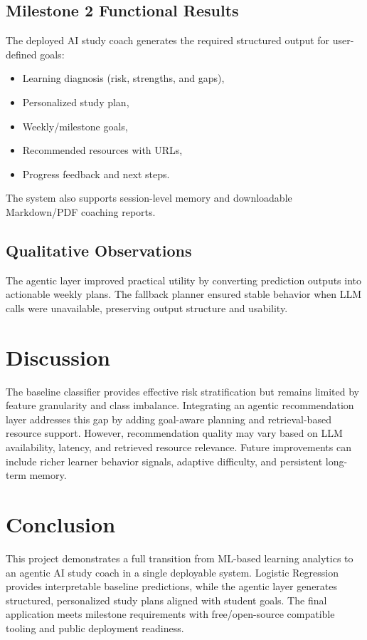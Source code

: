 \documentclass[conference]{IEEEtran}
\begin{document}
\subsection{Milestone 2 Functional Results}
The deployed AI study coach generates the required structured output for user-defined goals:
\begin{itemize}
    \item Learning diagnosis (risk, strengths, and gaps),
    \item Personalized study plan,
    \item Weekly/milestone goals,
    \item Recommended resources with URLs,
    \item Progress feedback and next steps.
\end{itemize}
The system also supports session-level memory and downloadable Markdown/PDF coaching reports.

\subsection{Qualitative Observations}
The agentic layer improved practical utility by converting prediction outputs into actionable weekly plans. The fallback planner ensured stable behavior when LLM calls were unavailable, preserving output structure and usability.

\section{Discussion}
The baseline classifier provides effective risk stratification but remains limited by feature granularity and class imbalance. Integrating an agentic recommendation layer addresses this gap by adding goal-aware planning and retrieval-based resource support. However, recommendation quality may vary based on LLM availability, latency, and retrieved resource relevance. Future improvements can include richer learner behavior signals, adaptive difficulty, and persistent long-term memory.

\section{Conclusion}
This project demonstrates a full transition from ML-based learning analytics to an agentic AI study coach in a single deployable system. Logistic Regression provides interpretable baseline predictions, while the agentic layer generates structured, personalized study plans aligned with student goals. The final application meets milestone requirements with free/open-source compatible tooling and public deployment readiness.
\end{document}
